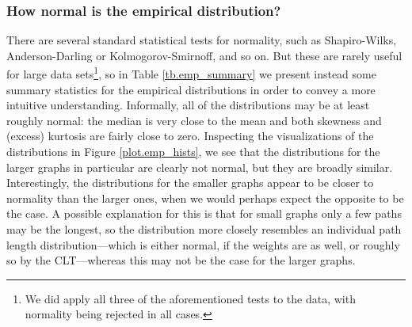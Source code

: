 \documentclass[12pt]{article}
\begin{document}
\subsubsection{How normal is the empirical distribution?}
\label{subsubsect.how_normal}

 There are several standard statistical tests for normality, such as Shapiro-Wilks, Anderson-Darling or Kolmogorov-Smirnoff, and so on. But these are rarely useful for large data sets\footnote{We did apply all three of the aforementioned tests to the data, with normality being rejected in all cases.}, so in Table \ref{tb.emp_summary} we present instead some summary statistics for the empirical distributions in order to convey a more intuitive understanding. Informally, all of the distributions may be at least roughly normal: the median is very close to the mean and both skewness and (excess) kurtosis are fairly close to zero. Inspecting the visualizations of the distributions in Figure \ref{plot.emp_hists}, we see that the distributions for the larger graphs in particular are clearly not normal, but they are broadly similar. Interestingly, the distributions for the smaller graphs appear to be closer to normality than the larger ones, when we would perhaps expect the opposite to be the case. A possible explanation for this is that for small graphs only a few paths may be the longest, so the distribution more closely resembles an individual path length distribution---which is either normal, if the weights are as well, or roughly so by the CLT---whereas this may not be the case for the larger graphs.  
\end{document}
